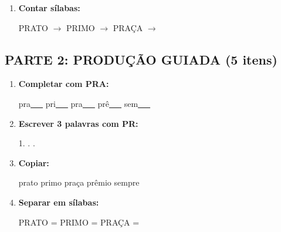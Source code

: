 \begin{exercicio}
\begin{enumerate}
  \item \textbf{Contar sílabas:}
  \begin{center}
  PRATO $\rightarrow$ \underline{\hspace{0.9cm}} \quad PRIMO $\rightarrow$ \underline{\hspace{0.9cm}} \quad PRAÇA $\rightarrow$ \underline{\hspace{0.9cm}}
  \end{center}

\end{enumerate}

\subsection*{PARTE 2: PRODUÇÃO GUIADA (5 itens)}

\begin{enumerate}[resume]

  \item \textbf{Completar com PRA:}
  \begin{center}
  pra\underline{~~~} \quad pri\underline{~~~} \quad pra\underline{~~~} \quad prê\underline{~~~} \quad sem\underline{~~~}
  \end{center}

  \item \textbf{Escrever 3 palavras com PR:}
  \begin{center}
  1. \underline{\hspace{3cm}} . \underline{\hspace{3cm}} . \underline{\hspace{3cm}}
  \end{center}

  \item \textbf{Copiar:}
  \begin{center}
  prato \quad primo \quad praça \quad prêmio \quad sempre
  \end{center}

  \item \textbf{Separar em sílabas:}
  \begin{center}
  PRATO = \underline{\hspace{1cm}} \underline{\hspace{1cm}} \quad PRIMO = \underline{\hspace{1cm}} \underline{\hspace{1cm}} \quad PRAÇA = \underline{\hspace{1cm}} \underline{\hspace{1cm}}
  \end{center}


\end{enumerate}
\end{exercicio}

